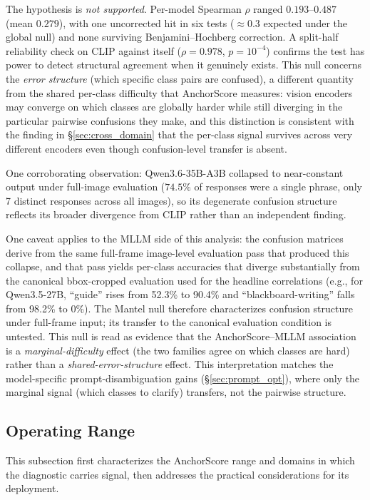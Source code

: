 \documentclass[11pt,a4paper]{article}
\begin{document}
\label{sec:mantel}
The hypothesis is \emph{not supported}. Per-model Spearman $\rho$ ranged $0.193$--$0.487$ (mean $0.279$), with one uncorrected hit in six tests ($\approx 0.3$ expected under the global null) and none surviving Benjamini--Hochberg correction. A split-half reliability check on CLIP against itself ($\rho{=}0.978$, $p{=}10^{-4}$) confirms the test has power to detect structural agreement when it genuinely exists. This null concerns the \emph{error structure} (which specific class pairs are confused), a different quantity from the shared per-class difficulty that AnchorScore measures: vision encoders may converge on which classes are globally harder while still diverging in the particular pairwise confusions they make, and this distinction is consistent with the finding in \S\ref{sec:cross_domain} that the per-class signal survives across very different encoders even though confusion-level transfer is absent.

One corroborating observation: Qwen3.6-35B-A3B collapsed to near-constant output under full-image evaluation ($74.5\%$ of responses were a single phrase, only 7 distinct responses across all images), so its degenerate confusion structure reflects its broader divergence from CLIP rather than an independent finding.

One caveat applies to the MLLM side of this analysis: the confusion matrices derive from the same full-frame image-level evaluation pass that produced this collapse, and that pass yields per-class accuracies that diverge substantially from the canonical bbox-cropped evaluation used for the headline correlations (e.g., for Qwen3.5-27B, ``guide'' rises from 52.3\% to 90.4\% and ``blackboard-writing'' falls from 98.2\% to 0\%). The Mantel null therefore characterizes confusion structure under full-frame input; its transfer to the canonical evaluation condition is untested. This null is read as evidence that the AnchorScore--MLLM association is a \emph{marginal-difficulty} effect (the two families agree on which classes are hard) rather than a \emph{shared-error-structure} effect. This interpretation matches the model-specific prompt-disambiguation gains (\S\ref{sec:prompt_opt}), where only the marginal signal (which classes to clarify) transfers, not the pairwise structure.

\subsection{Operating Range}

This subsection first characterizes the AnchorScore range and domains in which the diagnostic carries signal, then addresses the practical considerations for its deployment.
\end{document}
